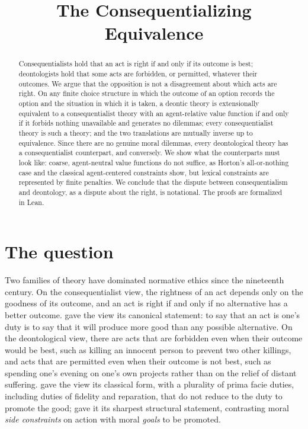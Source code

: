 \documentclass{situationist-preprint}
\title{The Consequentializing Equivalence}
\begin{document}
\maketitle

\begin{abstract}
Consequentialists hold that an act is right if and only if its outcome is best; deontologists hold that some acts are forbidden, or permitted, whatever their outcomes. We argue that the opposition is not a disagreement about which acts are right. On any finite choice structure in which the outcome of an option records the option and the situation in which it is taken, a deontic theory is extensionally equivalent to a consequentialist theory with an agent-relative value function if and only if it forbids nothing unavailable and generates no dilemmas; every consequentialist theory is such a theory; and the two translations are mutually inverse up to equivalence. Since there are no genuine moral dilemmas, every deontological theory has a consequentialist counterpart, and conversely. We show what the counterparts must look like: coarse, agent-neutral value functions do not suffice, as Horton's all-or-nothing case and the classical agent-centered constraints show, but lexical constraints are represented by finite penalties. We conclude that the dispute between consequentialism and deontology, as a dispute about the right, is notational. The proofs are formalized in Lean.
\end{abstract}

\section{The question}

Two families of theory have dominated normative ethics since the nineteenth century. On the consequentialist view, the rightness of an act depends only on the goodness of its outcome, and an act is right if and only if no alternative has a better outcome. \citet[ch.~5]{Moore1903} gave the view its canonical statement: to say that an act is one's duty is to say that it will produce more good than any possible alternative. On the deontological view, there are acts that are forbidden even when their outcome would be best, such as killing an innocent person to prevent two other killings, and acts that are permitted even when their outcome is not best, such as spending one's evening on one's own projects rather than on the relief of distant suffering. \citet{Ross1930} gave the view its classical form, with a plurality of prima facie duties, including duties of fidelity and reparation, that do not reduce to the duty to promote the good; \citet{Nozick1974} gave it its sharpest structural statement, contrasting moral \emph{side constraints} on action with moral \emph{goals} to be promoted.
\end{document}

